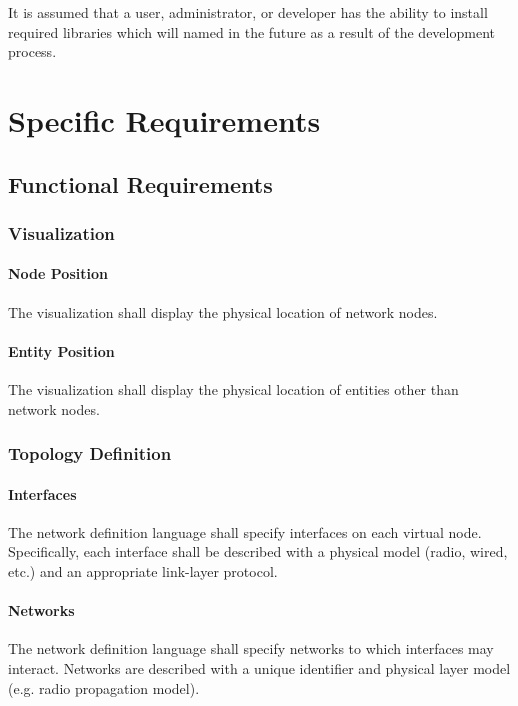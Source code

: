 \documentclass[titlepage]{article}
\begin{document}
It is assumed that a user, administrator, or developer has the ability to install required libraries which will named in the future as a result of the development process.


\section{Specific Requirements%
  \label{specific-requirements}%
}

\subsection{Functional Requirements%
    \label{functional}%
}

\subsubsection{Visualization}
\paragraph{Node Position} The visualization shall display the physical location of network nodes.
\paragraph{Entity Position} The visualization shall display the physical location of entities other than network nodes.

\subsubsection{Topology Definition}
\paragraph{Interfaces} The network definition language shall specify interfaces on each virtual node.  Specifically,
each interface shall be described with a physical model (radio, wired, etc.) and an appropriate link-layer protocol.

\paragraph{Networks} The network definition language shall specify networks to which interfaces may interact.  Networks
are described with a unique identifier and physical layer model (e.g. radio propagation model).
\end{document}

